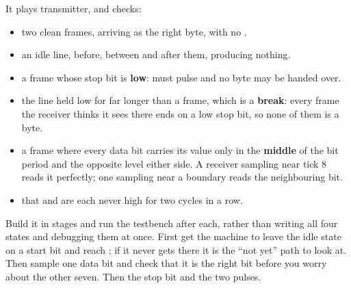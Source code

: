 It plays transmitter, and checks:
\begin{itemize}
  \item two clean frames, arriving as the right byte, with no .
  \item an idle line, before, between and after them, producing nothing.
  \item a frame whose stop bit is \textbf{low}:  must pulse and no byte may be handed
    over.
  \item the line held low for far longer than a frame, which is a \textbf{break}: every frame the
    receiver thinks it sees there ends on a low stop bit, so none of them is a byte.
  \item a frame where every data bit carries its value only in the \textbf{middle} of the bit period
    and the opposite level either side. A receiver sampling near tick 8 reads it perfectly; one
    sampling near a boundary reads the neighbouring bit.
  \item that  and  are each never high for two cycles in a row.
\end{itemize}

\note[Hint]Build it in stages and run the testbench after each, rather than writing all four states
and debugging them at once. First get the machine to leave the idle state on a start bit and reach
; if it never gets there it is the ``not yet'' path to look at. Then sample one data
bit and check that it is the right bit before you worry about the other seven. Then the stop bit and
the two pulses.

